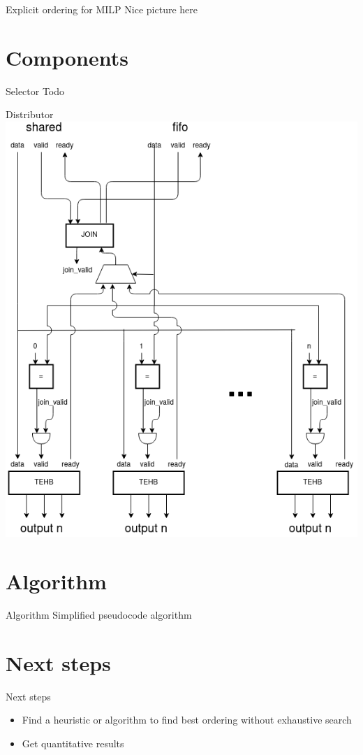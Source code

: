 \documentclass{beamer}
\begin{document}
\begin{frame}{Explicit ordering for MILP}
Nice picture here
\end{frame}

\section{Components}
\begin{frame}{Selector}
Todo
\end{frame}

\begin{frame}{Distributor}
    \includegraphics[scale=0.3]{distributor.png}
\end{frame}

\section{Algorithm}
\begin{frame}{Algorithm}
Simplified pseudocode algorithm
\end{frame}

\section{Next steps}
\begin{frame}{Next steps}
\begin{itemize}
    \item Find a heuristic or algorithm to find best ordering without exhaustive search
    \item Get quantitative results
\end{itemize}
\end{frame}
\end{document}
